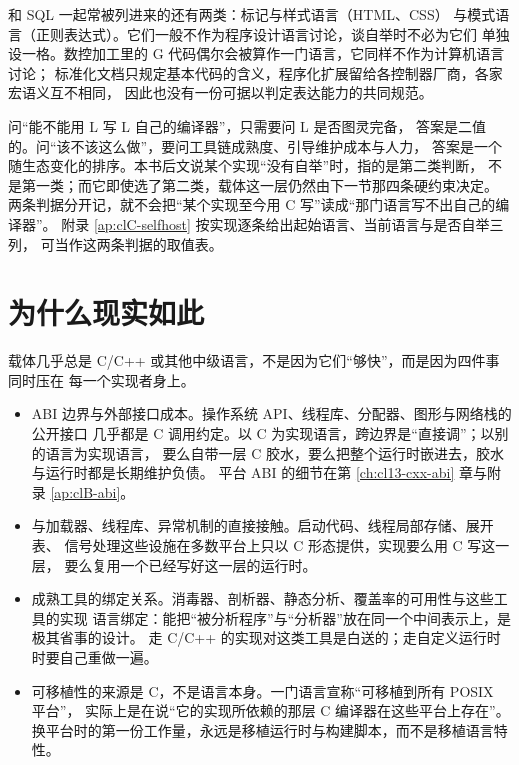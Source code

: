 \documentclass[12pt,a4paper,fontset=fandol]{ctexbook}
\newcommand{\Lang}[1]{\textsf{#1}}
\newcommand{\CL}{\Lang{C}}
\newcommand{\CPP}{\Lang{C++}}
\newcommand{\Mx}[1]{\textsf{#1}}
\begin{document}
和 \Mx{SQL} 一起常被列进来的还有两类：标记与样式语言（\Mx{HTML}、\Mx{CSS}）
与模式语言（正则表达式）。它们一般不作为程序设计语言讨论，谈自举时不必为它们
单独设一格。数控加工里的 G 代码偶尔会被算作一门语言，它同样不作为计算机语言讨论；
标准化文档只规定基本代码的含义，程序化扩展留给各控制器厂商，各家宏语义互不相同，
因此也没有一份可据以判定表达能力的共同规范。

\begin{note}[title={两条判据不要混用}]
问“能不能用 \Mx{L} 写 \Mx{L} 自己的编译器”，只需要问 \Mx{L} 是否图灵完备，
答案是二值的。问“该不该这么做”，要问工具链成熟度、引导维护成本与人力，
答案是一个随生态变化的排序。本书后文说某个实现“没有自举”时，指的是第二类判断，
不是第一类；而它即使选了第二类，载体这一层仍然由下一节那四条硬约束决定。
两条判据分开记，就不会把“某个实现至今用 \CL{} 写”读成“那门语言写不出自己的编译器”。
附录 \ref{ap:clC-selfhost} 按实现逐条给出起始语言、当前语言与是否自举三列，
可当作这两条判据的取值表。
\end{note}

\section{为什么现实如此}\label{sec:cl01-why}

载体几乎总是 \CL{}/\CPP{} 或其他中级语言，不是因为它们“够快”，而是因为四件事同时压在
每一个实现者身上。

\begin{guideline}[title={选择实现载体的四条硬约束}]
\begin{itemize}
  \item ABI 边界与外部接口成本。操作系统 API、线程库、分配器、图形与网络栈的公开接口
    几乎都是 \CL{} 调用约定。以 \CL{} 为实现语言，跨边界是“直接调”；以别的语言为实现语言，
    要么自带一层 \CL{} 胶水，要么把整个运行时嵌进去，胶水与运行时都是长期维护负债。
    平台 ABI 的细节在第 \ref{ch:cl13-cxx-abi} 章与附录 \ref{ap:clB-abi}。
  \item 与加载器、线程库、异常机制的直接接触。启动代码、线程局部存储、展开表、
    信号处理这些设施在多数平台上只以 \CL{} 形态提供，实现要么用 \CL{} 写这一层，
    要么复用一个已经写好这一层的运行时。
  \item 成熟工具的绑定关系。消毒器、剖析器、静态分析、覆盖率的可用性与这些工具的实现
    语言绑定：能把“被分析程序”与“分析器”放在同一个中间表示上，是极其省事的设计。
    走 \CL{}/\CPP{} 的实现对这类工具是白送的；走自定义运行时时要自己重做一遍。
  \item 可移植性的来源是 \CL{}，不是语言本身。一门语言宣称“可移植到所有 POSIX 平台”，
    实际上是在说“它的实现所依赖的那层 \CL{} 编译器在这些平台上存在”。
    换平台时的第一份工作量，永远是移植运行时与构建脚本，而不是移植语言特性。
\end{itemize}
\end{guideline}
\end{document}

